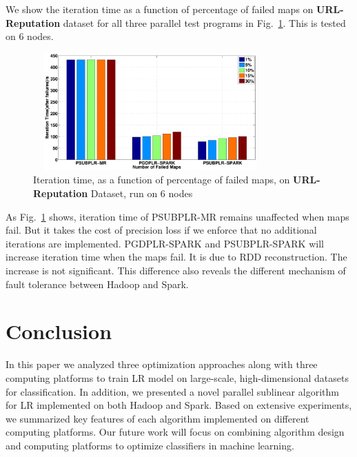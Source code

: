 \documentclass[10pt, conference, compsocconf]{IEEEtran}
\begin{document}
We show the iteration time as a function of percentage of failed maps on \textbf{URL-Reputation} dataset for all three parallel test programs in Fig.~\ref{fig:14}.
This is tested on 6 nodes.
\begin{figure}[tb]
\center \includegraphics[height=4.5cm,width=9cm]{img/fault_tolerance.eps}\vspace{-0.3cm}
\caption{Iteration time, as a function of percentage of failed maps, on \textbf{URL-Reputation} Dataset, run on 6 nodes}\label{fig:14}\vspace{-0.5cm}
\end{figure}
As Fig.~\ref{fig:14} shows, iteration time of PSUBPLR-MR remains unaffected when maps fail. But it takes the cost of precision loss if we enforce that no additional iterations are implemented.
PGDPLR-SPARK and PSUBPLR-SPARK will increase iteration time when the maps fail. It is due to RDD reconstruction. The increase is not significant.
This difference also reveals the different mechanism of fault tolerance between Hadoop and Spark.

\section{Conclusion} \label{sec:concl}
In this paper we analyzed three optimization approaches along with three computing platforms to train LR model on large-scale, high-dimensional datasets for classification. In addition, we presented a novel parallel sublinear algorithm for LR implemented on both Hadoop and Spark. Based on extensive experiments, we summarized key features of each algorithm implemented on different computing platforms.
Our future work will focus on combining algorithm design and computing platforms to optimize classifiers in machine learning.

\begin{small}


\end{small}
\end{document}
